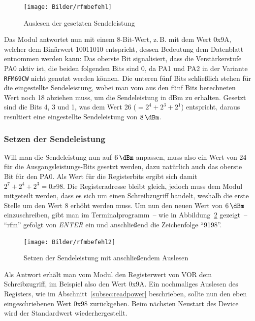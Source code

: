 \documentclass[paper=a4, parskip, numbers=noenddot, toc=listof, headsepline]{scrbook}
\begin{document}
					\begin{figure}
						\centering
						\texttt{[image: Bilder/rfmbefehl]}
						\caption{Auslesen der gesetzten Sendeleistung}
						\label{fig:rfmread}
					\end{figure}

					Das Modul antwortet nun mit einem 8-Bit-Wert, z.\,B. mit dem Wert 0x9A, welcher dem Binärwert 10011010 entspricht, dessen Bedeutung dem Datenblatt entnommen werden kann: Das oberste Bit signalisiert, dass die Verstärkerstufe PA0 aktiv ist, die beiden folgenden Bits sind 0, da PA1 und PA2 in der Variante \texttt{RFM69CW} nicht genutzt werden können. Die unteren fünf Bits schließlich stehen für die eingestellte Sendeleistung, wobei man vom aus den fünf Bits berechneten Wert noch 18 abziehen muss, um die Sendeleistung in dBm zu erhalten. Gesetzt sind die Bits 4, 3 und 1, was dem Wert 26 ($= 2^4 + 2^3 + 2^1$) entspricht, daraus resultiert eine eingestellte Sendeleistung von $\SI{8}{\dBm}$.

				\subsubsection{Setzen der Sendeleistung}

					Will man die Sendeleistung nun auf $\SI{6}{\dBm}$ anpassen, muss also ein Wert von 24 für die Aus\-gangs\-lei\-stungs-Bits gesetzt werden, dazu natürlich auch das oberste Bit für den PA0. Als Wert für die Registerbits ergibt sich damit $2^7 + 2^4 + 2^3 = 0x98$. Die Registeradresse bleibt gleich, jedoch muss dem Modul mitgeteilt werden, dass es sich um einen Schreibzugriff handelt, weshalb die erste Stelle um den Wert 8 erhöht werden muss. Um nun den neuen Wert von $\SI{6}{\dBm}$ einzuschreiben, gibt man im Terminalprogramm~-- wie in Abbildung~\ref{fig:rfmwrite} gezeigt~-- \enquote{rfm} gefolgt von \emph{ENTER} ein und anschließend die Zeichenfolge \enquote{9198}.

					\begin{figure}
						\centering
						\texttt{[image: Bilder/rfmbefehl2]}
						\caption{Setzen der Sendeleistung mit anschließendem Auslesen}
						\label{fig:rfmwrite}
					\end{figure}

					Als Antwort erhält man vom Modul den Registerwert von VOR dem Schreibzugriff, im Beispiel also den Wert 0x9A. Ein nochmaliges Auslesen des Registers, wie im Abschnitt~\ref{subsec:readpower} beschrieben, sollte nun den eben eingeschriebenen Wert 0x98 zurückgeben. Beim nächsten Neustart des Device wird der Standardwert wiederhergestellt.
\end{document}
